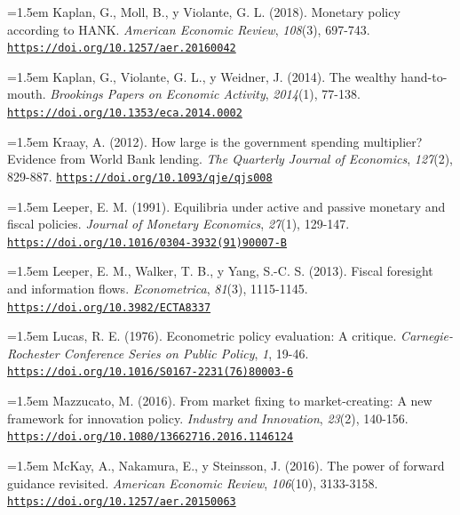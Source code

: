 \documentclass[10pt,a4paper]{article}
\begin{document}
\noindent\hangindent=1.5em Kaplan, G., Moll, B., y Violante, G. L. (2018). Monetary policy according to HANK. \textit{American Economic Review}, \textit{108}(3), 697-743. \href{https://doi.org/10.1257/aer.20160042}{\nolinkurl{https://doi.org/10.1257/aer.20160042}}

\noindent\hangindent=1.5em Kaplan, G., Violante, G. L., y Weidner, J. (2014). The wealthy hand-to-mouth. \textit{Brookings Papers on Economic Activity}, \textit{2014}(1), 77-138. \href{https://doi.org/10.1353/eca.2014.0002}{\nolinkurl{https://doi.org/10.1353/eca.2014.0002}}

\noindent\hangindent=1.5em Kraay, A. (2012). How large is the government spending multiplier? Evidence from World Bank lending. \textit{The Quarterly Journal of Economics}, \textit{127}(2), 829-887. \href{https://doi.org/10.1093/qje/qjs008}{\nolinkurl{https://doi.org/10.1093/qje/qjs008}}

\noindent\hangindent=1.5em Leeper, E. M. (1991). Equilibria under active and passive monetary and fiscal policies. \textit{Journal of Monetary Economics}, \textit{27}(1), 129-147. \href{https://doi.org/10.1016/0304-3932(91)90007-B}{\nolinkurl{https://doi.org/10.1016/0304-3932(91)90007-B}}

\noindent\hangindent=1.5em Leeper, E. M., Walker, T. B., y Yang, S.-C. S. (2013). Fiscal foresight and information flows. \textit{Econometrica}, \textit{81}(3), 1115-1145. \href{https://doi.org/10.3982/ECTA8337}{\nolinkurl{https://doi.org/10.3982/ECTA8337}}

\noindent\hangindent=1.5em Lucas, R. E. (1976). Econometric policy evaluation: A critique. \textit{Carnegie-Rochester Conference Series on Public Policy}, \textit{1}, 19-46. \href{https://doi.org/10.1016/S0167-2231(76)80003-6}{\nolinkurl{https://doi.org/10.1016/S0167-2231(76)80003-6}}

\noindent\hangindent=1.5em Mazzucato, M. (2016). From market fixing to market-creating: A new framework for innovation policy. \textit{Industry and Innovation}, \textit{23}(2), 140-156. \href{https://doi.org/10.1080/13662716.2016.1146124}{\nolinkurl{https://doi.org/10.1080/13662716.2016.1146124}}

\noindent\hangindent=1.5em McKay, A., Nakamura, E., y Steinsson, J. (2016). The power of forward guidance revisited. \textit{American Economic Review}, \textit{106}(10), 3133-3158. \href{https://doi.org/10.1257/aer.20150063}{\nolinkurl{https://doi.org/10.1257/aer.20150063}}
\end{document}

